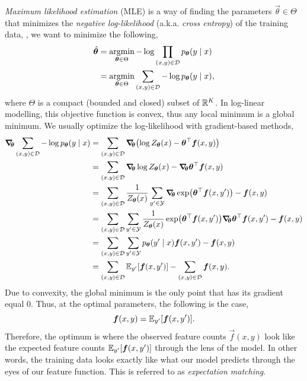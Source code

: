 \textit{Maximum likelihood estimation} (MLE) is a way of finding the parameters
$\vec{\theta}\in\Theta$ that minimizes the \textit{negative log-likelihood}
(a.k.a. \textit{cross entropy}) of the training data, \ie, we want to minimize
the following, 
\begin{align*}
  \hat{\bm{\theta}} &= \operatorname*{argmin}_{\bm{\theta}\in\Theta} -\log \prod_{(x,y)\in\mathcal{D}} p_{\bm{\theta}}(y \mid x) \\
  &= \operatorname*{argmin}_{\bm{\theta}\in\Theta} \sum_{(x,y)\in\mathcal{D}} -\log p_{\bm{\theta}}(y\mid x)
,\end{align*}
where $\Theta$ is a compact (bounded and closed) subset of $\mathbb{R}^K$. In log-linear modelling, this objective function is convex, thus
any local minimum is a global minimum. We usually optimize the log-likelihood
with gradient-based methods,
\begin{align*}
  \grad{\sum_{(x,y)\in\mathcal{D}} - \log p_{\vec{\theta}}(y \mid x)}{\vec{\theta}} &= \sum_{(x,y)\in\mathcal{D}} \grad{\lft( \log Z_{\vec{\theta}}(x) - \transpose{\vec{\theta}} \vec{f}(x,y) \rgt)}{\vec{\theta}} \\ 
  &= \sum_{(x,y)\in\mathcal{D}} \grad{\log Z_{\vec{\theta}}(x)}{\vec{\theta}} - \grad{\transpose{\vec{\theta}} \vec{f}(x,y)}{\vec{\theta}} \\
  &= \sum_{(x,y)\in\mathcal{D}} \frac{1}{Z_{\vec{\theta}}(x)} \sum_{y'\in\mathcal{Y}} \grad{\exp \lft( \transpose{\vec{\theta}} \vec{f}(x,y') \rgt)}{\vec{\theta}} - \vec{f}(x,y) \\
  &= \sum_{(x,y)\in\mathcal{D}} \sum_{y'\in\mathcal{Y}} \frac{1}{Z_{\vec{\theta}}(x)} \exp \lft( \transpose{\vec{\theta}} \vec{f}(x,y') \rgt) \grad{\transpose{\vec{\theta}} \vec{f}(x,y')}{\vec{\theta}} - \vec{f}(x,y) \\
  &= \sum_{(x,y)\in\mathcal{D}} \sum_{y'\in\mathcal{Y}} p_{\vec{\theta}}(y'\mid x) \vec{f}(x,y') - \vec{f}(x,y) \\
  &= \sum_{(x,y)\in\mathcal{D}} \E_{y'} [\vec{f}(x,y')] - \sum_{(x,y)\in\mathcal{D}} \vec{f}(x,y)
.\end{align*}
Due to convexity, the global minimum is the only point that has its gradient
equal $0$. Thus, at the optimal parameters, the following is the case, \[
  \bm{f}(x,y) = \mathbb{E}_{y'} [\bm{f}(x,y')]
.\]
Therefore, the optimum is where the observed feature counts $\vec{f}(x,y)$ look
like the expected feature counts $\mathbb{E}_{y'} [\bm{f}(x,y')]$ through the lens of
the model. In other words, the training data looks exactly like what our model
predicts through the eyes of our feature function. This is referred to as
\textit{expectation matching}.

